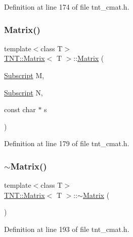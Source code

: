 Definition at line 174 of file tnt\+\_\+cmat.\+h.

\mbox{\label{classTNT_1_1Matrix_a4f19bfddcd8e952d7709d3d4b969bd44}} 
\subsubsection{\texorpdfstring{Matrix()}{Matrix()}\hspace{0.1cm}{\footnotesize\ttfamily [5/5]}}
{\footnotesize\ttfamily template$<$class T$>$ \\
\hyperlink{classTNT_1_1Matrix}{T\+N\+T\+::\+Matrix}$<$ T $>$\+::\hyperlink{classTNT_1_1Matrix}{Matrix} (\begin{DoxyParamCaption}\item[{\hyperlink{namespaceTNT_af22e3f1460e145c04ce4e7d701e4c1c1}{Subscript}}]{M,  }\item[{\hyperlink{namespaceTNT_af22e3f1460e145c04ce4e7d701e4c1c1}{Subscript}}]{N,  }\item[{const char $\ast$}]{s }\end{DoxyParamCaption})\hspace{0.3cm}{\ttfamily [inline]}}



Definition at line 179 of file tnt\+\_\+cmat.\+h.

\mbox{\label{classTNT_1_1Matrix_ac3cd6db0fe4b5aecd460c99b8a456aae}} 
\subsubsection{\texorpdfstring{$\sim$\+Matrix()}{~Matrix()}}
{\footnotesize\ttfamily template$<$class T$>$ \\
\hyperlink{classTNT_1_1Matrix}{T\+N\+T\+::\+Matrix}$<$ T $>$\+::$\sim$\hyperlink{classTNT_1_1Matrix}{Matrix} (\begin{DoxyParamCaption}{ }\end{DoxyParamCaption})\hspace{0.3cm}{\ttfamily [inline]}}



Definition at line 193 of file tnt\+\_\+cmat.\+h.



